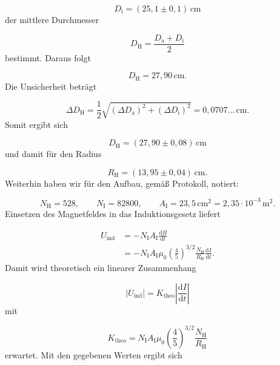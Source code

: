 \documentclass{report}
\begin{document}
\begin{equation}
D_{\mathrm{i}}
=
(25{,}1\pm0{,}1)\,\mathrm{cm}
\end{equation}
\noindent
der mittlere Durchmesser

\begin{equation}
D_{\mathrm H}
=
\frac{D_{\mathrm a}+D_{\mathrm i}}{2}
\end{equation}
\noindent
bestimmt. Daraus folgt

\begin{equation}
D_{\mathrm H}
=
27{,}90\,\mathrm{cm}.
\end{equation}
\noindent
Die Unsicherheit beträgt

\begin{equation}
\Delta D_{\mathrm H}
=
\frac{1}{2}
\sqrt{
(\Delta D_{\mathrm a})^2+
(\Delta D_{\mathrm i})^2
}
=
0{,}0707\ldots\,\mathrm{cm}.
\end{equation}
\noindent
Somit ergibt sich

\begin{equation}
\boxed{
D_{\mathrm H}
=
(27{,}90\pm0{,}08)\,\mathrm{cm}
}
\end{equation}
\noindent
und damit für den Radius

\begin{equation}
\boxed{
R_{\mathrm H}
=
(13{,}95\pm0{,}04)\,\mathrm{cm}
}.
\end{equation}
\noindent
Weiterhin haben wir für den Aufbau, gemäß Protokoll, notiert:

\begin{equation}
N_{\mathrm H}=528,
\qquad
N_{\mathrm I}=82800,
\qquad
A_{\mathrm I}=23{,}5\,\mathrm{cm^2}
=
2{,}35\cdot10^{-3}\,\mathrm{m^2}.
\end{equation}
\noindent
Einsetzen des Magnetfeldes in das Induktionsgesetz liefert

\begin{align}
U_{\mathrm{ind}}
&=
-N_{\mathrm I}A_{\mathrm I}
\frac{\mathrm dB}{\mathrm dt}\\
&=
-N_{\mathrm I}A_{\mathrm I}
\mu_0
\left(\frac{4}{5}\right)^{3/2}
\frac{N_{\mathrm H}}{R_{\mathrm H}}
\frac{\mathrm dI}{\mathrm dt}.
\end{align}
\noindent
Damit wird theoretisch ein linearer Zusammenhang

\begin{equation}
|U_{\mathrm{ind}}|
=
K_{\mathrm{theo}}
\left|
\frac{\mathrm dI}{\mathrm dt}
\right|
\end{equation}
\noindent
mit

\begin{equation}
K_{\mathrm{theo}}
=
N_{\mathrm I}A_{\mathrm I}
\mu_0
\left(\frac{4}{5}\right)^{3/2}
\frac{N_{\mathrm H}}{R_{\mathrm H}}
\end{equation}
\noindent
erwartet.
\noindent
Mit den gegebenen Werten ergibt sich
\end{document}
